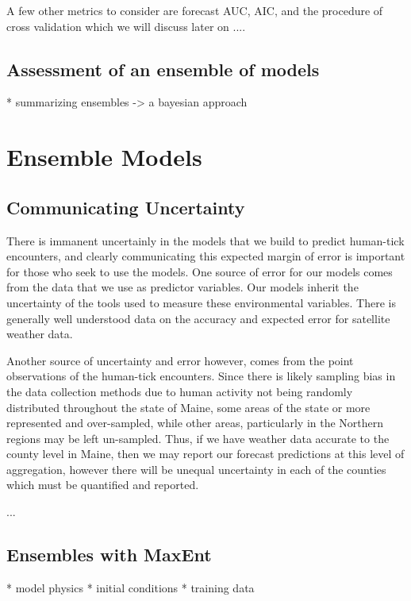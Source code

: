 \noindent A few other metrics to consider are forecast AUC, AIC, and the procedure of cross validation which we will discuss later on ....\newline

\subsection{Assessment of an ensemble of models}
* summarizing ensembles -> a bayesian approach \newline





\section{Ensemble Models}

\subsection{Communicating Uncertainty}
There is immanent uncertainly in the models that we build to predict human-tick encounters, and clearly communicating this expected margin of error is important for those who seek to use the models. One source of error for our models comes from the data that we use as predictor variables. Our models inherit the uncertainty of the tools used to measure these environmental variables. There is generally well understood data on the accuracy and expected error for satellite weather data. \newline

\noindent Another source of uncertainty and error however, comes from the point observations of the human-tick encounters. Since there is likely sampling bias in the data collection methods due to human activity not being randomly distributed throughout the state of Maine, some areas of the state or more represented and over-sampled, while other areas, particularly in the Northern regions may be left un-sampled. Thus, if we have weather data accurate to the county level in Maine, then we may report our forecast predictions at this level of aggregation, however there will be unequal uncertainty in each of the counties which must be quantified and reported.

 ...\newline

\subsection{Ensembles with MaxEnt}
* model physics \newline
* initial conditions\newline
* training data \newline


